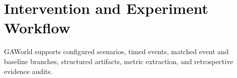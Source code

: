 \section{Intervention and Experiment Workflow}
GAWorld supports configured scenarios, timed events, matched event and baseline branches, structured
artifacts, metric extraction, and retrospective evidence audits.
